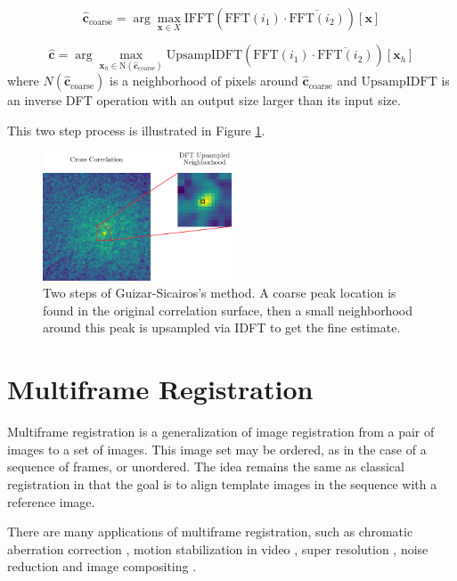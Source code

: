 \documentclass[tocnosub,noragright,centerchapter,12pt]{uiucecethesis09}
\begin{document}
$$\hat{\bm{c}}_{\text{coarse}} = \arg \max_{\bm{x} \in X} \text{IFFT} \left( \text{FFT}\left(i_1\right) \cdot \overline{\text{FFT}\left(i_2\right)} \right)[\bm{x}]$$

$$\hat{\bm{c}} = \arg \max_{\bm{x}_h \in \text{N}(\hat{\bm{c}}_{\text{coarse}})} \text{UpsampIDFT} \left( \text{FFT}\left(i_1\right) \cdot \overline{\text{FFT}\left(i_2\right)} \right)[\bm{x}_h]$$
where $N(\hat{\bm{c}}_{\text{coarse}})$ is a neighborhood of pixels around $\hat{\bm{c}}_{\text{coarse}}$ and  $\text{UpsampIDFT}$ is an inverse DFT operation with an output size larger than its input size.

This two step process is illustrated in Figure \ref{fig:guizar}.

\begin{figure}
    \centering
    \includegraphics[width=0.5\textwidth]{figures/guizar_upsample.png}
    \caption{Two steps of Guizar-Sicairos's method.  A coarse peak location is found in the original correlation surface, then a small neighborhood around this peak is upsampled via IDFT to get the fine estimate.}
    \label{fig:guizar}
\end{figure}

\chapter{Multiframe Registration} \label{chap:multiframe}

Multiframe registration is a generalization of image registration from a pair of images to a set of images.  This image set may be ordered, as in the case of a sequence of frames, or unordered.  The idea remains the same as classical registration in that the goal is to align template images in the sequence with a reference image.

There are many applications of multiframe registration, such as chromatic aberration correction \cite{aberration}, motion stabilization in video \cite{smoothing}, super resolution \cite{farsiu2004}, noise reduction and image compositing \cite{salient}.
\end{document}
